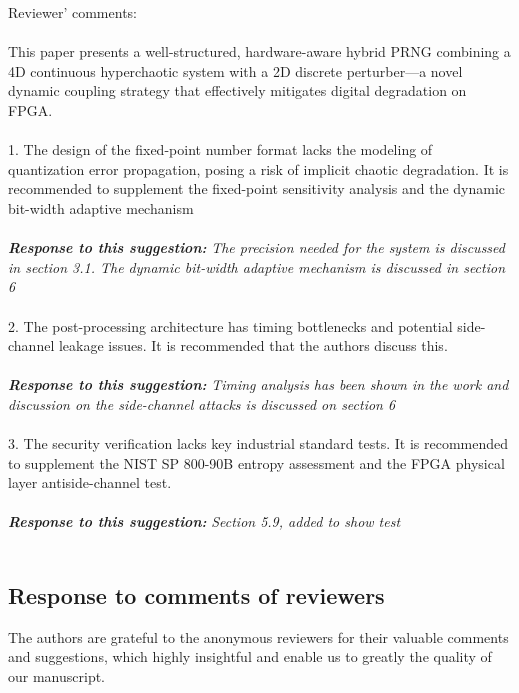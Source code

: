 \documentclass{report}
\begin{document}
Reviewer' comments:
\\
\\
This paper presents a well-structured, hardware-aware hybrid PRNG combining a 4D
continuous hyperchaotic system with a 2D discrete perturber—a novel dynamic coupling
strategy that effectively mitigates digital degradation on FPGA.
\\
\\
1. The design of the fixed-point number format lacks the modeling of quantization error
propagation, posing a risk of implicit chaotic degradation. It is recommended to
supplement the fixed-point sensitivity analysis and the dynamic bit-width adaptive
mechanism
\\
\\
\textbf{\textit{Response to this suggestion:}}
\textit{
The precision needed for the system is discussed in section 3.1.
The dynamic bit-width adaptive mechanism is discussed in section 6
}
\\
\\
2. The post-processing architecture has timing bottlenecks and potential side-channel
leakage issues. It is recommended that the authors discuss this.
\\
\\ 
\textbf{\textit{Response to this suggestion:}}
\textit{Timing analysis has been shown in the work and discussion on the side-channel attacks is discussed on section 6}
\\
\\
3. The security verification lacks key industrial standard tests. It is recommended to
supplement the NIST SP 800-90B entropy assessment and the FPGA physical layer antiside-channel test. 
\\
\\
\textbf{\textit{Response to this suggestion:}}
\textit{Section 5.9, added to show test}
\\
\\



\newpage
\begin{center}
\section*{Response to comments of reviewers}
\end{center}

\vspace{0.5cm} %

The authors are grateful to the anonymous reviewers for their valuable comments and suggestions, which highly insightful and enable us to greatly the quality of our manuscript.   
\end{document}
